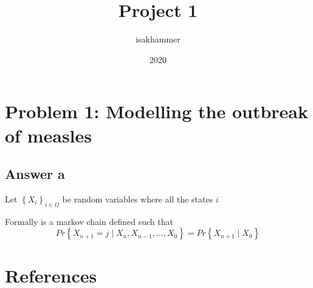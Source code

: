 \documentclass{article}
\title{Project 1}
\author{isakhammer }
\date{2020}
\theoremstyle{remark}
\begin{document}
\maketitle
\tableofcontents
\newpage

\newpage
\section{Problem 1: Modelling the outbreak of measles }%
\label{sec:problem_1_modelling_the_outbreak_of_measles_}


\subsection{Answer a}%
\label{sub:answer_a}

\begin{definition}
  Let $\left\{ X_{i} \right\}_{i \in \Omega }$ be random variables where all the states $i$
  
\end{definition}
Formally is a markov chain defined such that  \[
Pr \left \{ X_{n+1} = j   \mid X_{n}, X_{n-1}, \ldots, X_{0}  \right \}  = Pr \left \{ X_{n+1}  \mid  X_{0} \right \} 
\] 




\newpage
\section{References}%
\label{sec:references}



\end{document}
